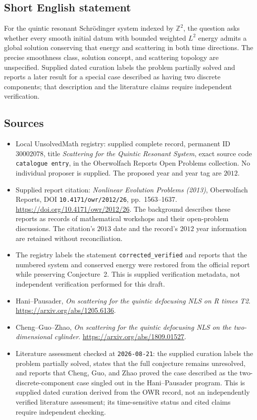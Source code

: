 \documentclass[11pt]{article}
\newcommand{\Z}{\mathbb{Z}}
\begin{document}
\subsection{Short English statement}
For the quintic resonant Schr\"odinger system indexed by $\Z^2$, the question asks whether every smooth initial datum with bounded weighted $L^2$ energy admits a global solution conserving that energy and scattering in both time directions. The precise smoothness class, solution concept, and scattering topology are unspecified. Supplied dated curation labels the problem partially solved and reports a later result for a special case described as having two discrete components; that description and the literature claims require independent verification.
\subsection{Sources}
\begin{itemize}
\item Local UnsolvedMath registry: supplied complete record, permanent ID $30002078$, title \emph{Scattering for the Quintic Resonant System}, exact source code \texttt{catalogue entry}, in the Oberwolfach Reports Open Problems collection. No individual proposer is supplied. The proposed year and year tag are $2012$.
\item Supplied report citation: \emph{Nonlinear Evolution Problems (2013)}, Oberwolfach Reports, DOI \texttt{10.4171/owr/2012/26}, pp.~1563--1637. \url{https://doi.org/10.4171/owr/2012/26}. The background describes these reports as records of mathematical workshops and their open-problem discussions. The citation's $2013$ date and the record's $2012$ year information are retained without reconciliation.
\item The registry labels the statement \texttt{corrected\_verified} and reports that the numbered system and conserved energy were restored from the official report while preserving Conjecture~2. This is supplied verification metadata, not independent verification performed for this draft.
\item Hani--Pausader, \emph{On scattering for the quintic defocusing NLS on R times T2}. \url{https://arxiv.org/abs/1205.6136}.
\item Cheng--Guo--Zhao, \emph{On scattering for the quintic defocusing NLS on the two-dimensional cylinder}. \url{https://arxiv.org/abs/1809.01527}.
\item Literature assessment checked at \texttt{2026-08-21}: the supplied curation labels the problem partially solved, states that the full conjecture remains unresolved, and reports that Cheng, Guo, and Zhao proved the case described as the two-discrete-component case singled out in the Hani--Pausader program. This is supplied dated curation derived from the OWR record, not an independently verified literature assessment; its time-sensitive status and cited claims require independent checking.
\end{itemize}
\end{document}

